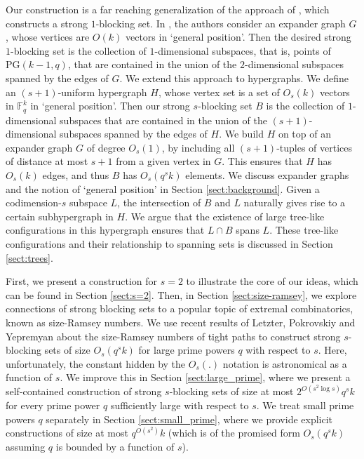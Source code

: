 \documentclass[11pt]{article}
\theoremstyle{plain}
\theoremstyle{definition}
\begin{document}
Our construction is a far reaching generalization of the approach of \cite{alon2024strong}, which constructs a strong $1$-blocking set. In \cite{alon2024strong}, the authors consider an expander graph $G$, whose vertices are $O(k)$ vectors in `general position'. Then the desired strong $1$-blocking set is  the collection of $1$-dimensional subspaces, that is, points of $\mathrm{PG}(k - 1, q)$, that are contained in the union of the $2$-dimensional subspaces spanned by the edges of $G$. We extend this approach to hypergraphs. We define an $(s+1)$-uniform hypergraph $H$, whose vertex set is a set of $O_s(k)$ vectors in $\mathbb{F}_q^k$ in `general position'. Then our strong $s$-blocking set $B$ is the collection of $1$-dimensional subspaces that are contained in the union of the $(s+1)$-dimensional subspaces spanned by the edges of $H$.  We build $H$ on top of an expander graph $G$ of degree $O_s(1)$, by including all $(s+1)$-tuples of vertices of distance at most $s+1$ from a given vertex in $G$. This ensures that $H$ has $O_s(k)$ edges, and thus $B$ has $O_s(q^sk)$ elements. We discuss expander graphs and the notion of `general position' in Section \ref{sect:background}. Given a codimension-$s$ subspace $L$, the intersection of $B$ and $L$ naturally gives rise to a certain subhypergraph in $H$. We argue that the existence of large tree-like configurations in this hypergraph ensures that $L\cap B$ spans $L$. These tree-like configurations and their relationship to spanning sets is discussed in Section \ref{sect:trees}.

First, we present a construction for $s=2$ to illustrate the core of our ideas, which can be found in Section \ref{sect:s=2}. Then, in Section \ref{sect:size-ramsey}, we explore connections of strong blocking sets to a popular topic of extremal combinatorics, known as size-Ramsey numbers. We use recent results of Letzter, Pokrovskiy and Yepremyan \cite{LPY} about the size-Ramsey numbers of tight paths to construct  strong $s$-blocking sets of size $O_s(q^sk)$ for large prime powers $q$ with respect to $s$. Here, unfortunately, the constant hidden by the $O_s(.)$ notation is astronomical as a function of $s$. We improve this in Section \ref{sect:large_prime}, where we present a self-contained construction of strong $s$-blocking sets of size at most $2^{O(s^2\log s)}q^sk$ for every prime power $q$ sufficiently large with respect to $s$. 
We treat small prime powers $q$ separately in Section \ref{sect:small_prime}, where we provide explicit constructions of size at most $q^{O(s^2)}k$ (which is of the promised form $O_s(q^sk)$ assuming $q$ is bounded by a function of $s$).
\end{document}

